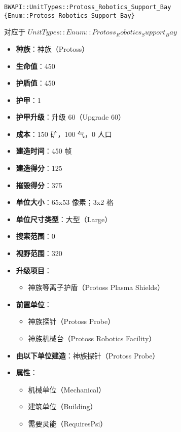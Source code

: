 \begin{tcolorbox}[colback=white, colframe=black!60!white, title=Protoss\_Robotics\_Support\_Bay(), arc=0mm]
    \begin{verbatim}
BWAPI::UnitTypes::Protoss_Robotics_Support_Bay {Enum::Protoss_Robotics_Support_Bay}
    \end{verbatim}
    对应于  $ UnitTypes::Enum::Protoss_Robotics_Support_Bay $ 
    \begin{itemize}
        \item \textbf{种族}：神族（Protoss）
        \item \textbf{生命值}：450
        \item \textbf{护盾值}：450
        \item \textbf{护甲}：1
        \item \textbf{护甲升级}：升级 60（Upgrade 60）
        \item \textbf{成本}：150 矿，100 气，0 人口
        \item \textbf{建造时间}：450 帧
        \item \textbf{建造得分}：125
        \item \textbf{摧毁得分}：375
        \item \textbf{单位大小}：65x53 像素；3x2 格
        \item \textbf{单位尺寸类型}：大型（Large）
        \item \textbf{搜索范围}：0
        \item \textbf{视野范围}：320
        \item \textbf{升级项目}：
            \begin{itemize}
                \item 神族等离子护盾（Protoss Plasma Shields）
            \end{itemize}
        \item \textbf{前置单位}：
            \begin{itemize}
                \item 神族探针（Protoss Probe）
                \item 神族机械台（Protoss Robotics Facility）
            \end{itemize}
        \item \textbf{由以下单位建造}：神族探针（Protoss Probe）
        \item \textbf{属性}：
            \begin{itemize}
                \item 机械单位（Mechanical）
                \item 建筑单位（Building）
                \item 需要灵能（RequiresPsi）
            \end{itemize}
    \end{itemize}
\end{tcolorbox}

